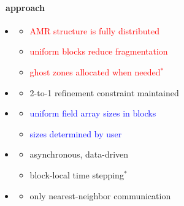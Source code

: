 
\begin{frame}[fragile] 
\secframetitle{\ssApproach}
\framesubtitle{\enzopcello\ approach}
\begin{minipage}{3.0in}
\begin{itemize}
\item {}
\begin{itemize}
  \item<2-> \textcolor{red}{AMR structure is fully distributed}
  \item<2-> \textcolor{red}{uniform blocks reduce fragmentation}
  \item<2-> \textcolor{red}{ghost zones allocated when needed$^*$}
\end{itemize}
\item {}
\begin{itemize}
   \item<3-> \textcolor{green!80!black}{2-to-1 refinement constraint maintained}
\end{itemize}
\item {}
\begin{itemize}
   \item<4-> \textcolor{blue}{uniform field array sizes in blocks}
   \item<4-> \textcolor{blue}{sizes determined by user}
\end{itemize}
\item {}
\begin{itemize}
   \item<5-> \textcolor{cyan!80!black}{asynchronous, data-driven}
   \item<5-> \textcolor{cyan!80!black}{block-local time stepping$^*$}
\end{itemize}
\item {}
\begin{itemize}
   \item<6-> \textcolor{orange!80!black}{only nearest-neighbor communication}
\end{itemize}

\end{itemize}
\end{minipage}
\end{frame}
